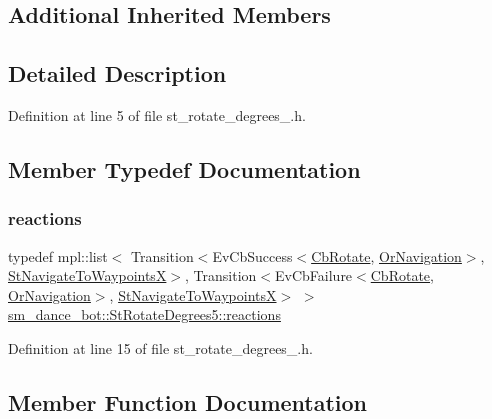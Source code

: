 \subsection*{Additional Inherited Members}


\subsection{Detailed Description}


Definition at line 5 of file st\+\_\+rotate\+\_\+degrees\+\_.\+h.



\subsection{Member Typedef Documentation}
\mbox{\label{structsm__dance__bot_1_1StRotateDegrees5_aa7b7dab27b4534c1ce16ad339d4a148e}} 
\subsubsection{\texorpdfstring{reactions}{reactions}}
{\footnotesize\ttfamily typedef mpl\+::list$<$ Transition$<$Ev\+Cb\+Success$<$\hyperlink{classcl__move__base__z_1_1CbRotate}{Cb\+Rotate}, \hyperlink{classsm__dance__bot_1_1OrNavigation}{Or\+Navigation}$>$, \hyperlink{structsm__dance__bot_1_1StNavigateToWaypointsX}{St\+Navigate\+To\+WaypointsX}$>$, Transition$<$Ev\+Cb\+Failure$<$\hyperlink{classcl__move__base__z_1_1CbRotate}{Cb\+Rotate}, \hyperlink{classsm__dance__bot_1_1OrNavigation}{Or\+Navigation}$>$, \hyperlink{structsm__dance__bot_1_1StNavigateToWaypointsX}{St\+Navigate\+To\+WaypointsX}$>$ $>$ \hyperlink{structsm__dance__bot_1_1StRotateDegrees5_aa7b7dab27b4534c1ce16ad339d4a148e}{sm\+\_\+dance\+\_\+bot\+::\+St\+Rotate\+Degrees5\+::reactions}}



Definition at line 15 of file st\+\_\+rotate\+\_\+degrees\+\_.\+h.



\subsection{Member Function Documentation}
\mbox{\label{structsm__dance__bot_1_1StRotateDegrees5_a60fd6ec21fe69a27245785e83b610b57}} 
